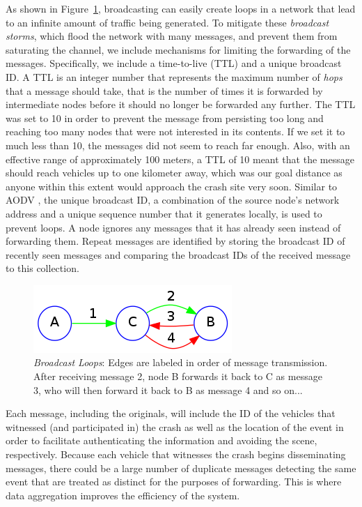 \documentclass{IEEEtran}
\begin{document}
As shown in Figure~\ref{broadcast_loop}, broadcasting can easily create loops in a network that lead to an infinite amount of traffic being generated.
To mitigate these \emph{broadcast storms}, which flood the network with many messages, and prevent them from saturating the channel, we include mechanisms for limiting the forwarding of the messages.
Specifically, we include a time-to-live (TTL) and a unique broadcast ID.
A TTL is an integer number that represents the maximum number of \emph{hops} that a message should take, that is the number of times it is forwarded by intermediate nodes before it should no longer be forwarded any further.
The TTL was set to 10 in order to prevent the message from persisting too long and reaching too many nodes that were not interested in its contents.
If we set it to much less than 10, the messages did not seem to reach far enough.
Also, with an effective range of approximately 100 meters, a TTL of 10 meant that the message should reach vehicles up to one kilometer away, which was our goal distance as anyone within this extent would approach the crash site very soon.
Similar to AODV \cite{aodv}, the unique broadcast ID, a combination of the source node's network address and a unique sequence number that it generates locally, is used to prevent loops.
A node ignores any messages that it has already seen instead of forwarding them.
Repeat messages are identified by storing the broadcast ID of recently seen messages and comparing the broadcast IDs of the received message to this collection.

\begin{figure}
 \includegraphics[width=\linewidth,keepaspectratio=true]{broadcast_loop.png}
  \caption{\emph{Broadcast Loops}: Edges are labeled in order of message transmission.  After receiving message 2, node B forwards it back to C as message 3, who will then forward it back to B as message 4 and so on...}
  \label{broadcast_loop}
\end{figure}

Each message, including the originals, will include the ID of the vehicles that witnessed (and participated in) the crash as well as the location of the event in order to facilitate authenticating the information and avoiding the scene, respectively.
Because each vehicle that witnesses the crash begins disseminating messages, there could be a large number of duplicate messages detecting the same event that are treated as distinct for the purposes of forwarding.
This is where data aggregation improves the efficiency of the system.
\end{document}
